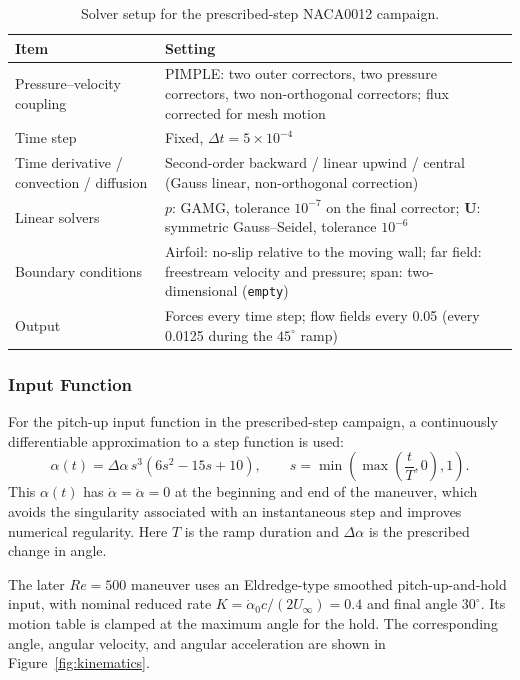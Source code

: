 \begin{table}[htbp]\centering\small
\caption{Solver setup for the prescribed-step NACA0012 campaign.}\label{tab:pitch_solver}
\begin{tabularx}{\linewidth}{@{}>{\raggedright\arraybackslash}p{.28\linewidth}X@{}}
\toprule Item & Setting \\
\midrule
Pressure--velocity coupling & PIMPLE: two outer correctors, two pressure correctors, two non-orthogonal correctors; flux corrected for mesh motion \\
Time step & Fixed, $\Delta t=5\times10^{-4}$ \\
Time derivative / convection / diffusion & Second-order backward / linear upwind / central (Gauss linear, non-orthogonal correction) \\
Linear solvers & $p$: GAMG, tolerance $10^{-7}$ on the final corrector; $\mathbf{U}$: symmetric Gauss--Seidel, tolerance $10^{-6}$ \\
Boundary conditions & Airfoil: no-slip relative to the moving wall; far field: freestream velocity and pressure; span: two-dimensional (\texttt{empty}) \\
Output & Forces every time step; flow fields every 0.05 (every 0.0125 during the $45^\circ$ ramp) \\
\bottomrule
\end{tabularx}
\end{table}

\FloatBarrier
\subsubsection{Input Function}
For the pitch-up input function in the prescribed-step campaign, a continuously differentiable approximation to a step function is used:
\begin{equation}
\alpha(t)=\Delta\alpha\,s^3(6s^2-15s+10),
\qquad s=\min\!\left(\max\!\left(\frac{t}{T},0\right),1\right).
\end{equation}
This $\alpha(t)$ has $\dot\alpha=\ddot\alpha=0$ at the beginning and end of the maneuver, which avoids the singularity associated with an instantaneous step and improves numerical regularity. Here $T$ is the ramp duration and $\Delta\alpha$ is the prescribed change in angle.

The later $Re=500$ maneuver uses an Eldredge-type smoothed pitch-up-and-hold input, with nominal reduced rate $K=\dot\alpha_0c/(2U_\infty)=0.4$ and final angle $30^\circ$. Its motion table is clamped at the maximum angle for the hold. The corresponding angle, angular velocity, and angular acceleration are shown in Figure~\ref{fig:kinematics}.

\FloatBarrier
